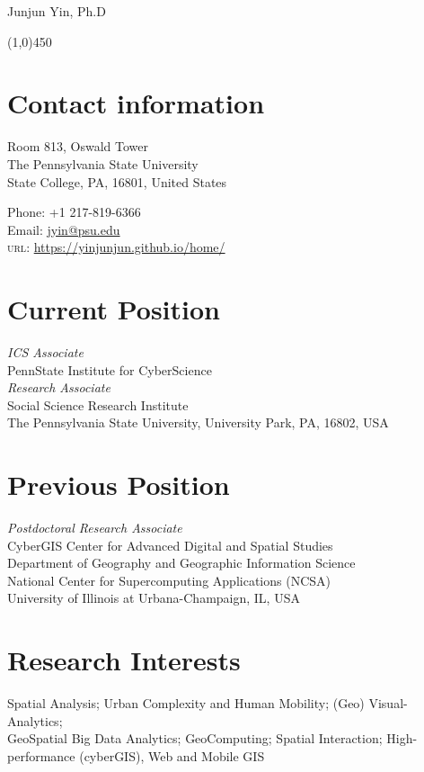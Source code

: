 \documentclass[11pt, a4paper]{article}
\begin{document}
{\LARGE Junjun Yin, Ph.D}
\begin{center}
\line(1,0){450}
\end{center}
\section*{Contact information}

\begin{multicols}{2}
 \begin{flushleft}
Room 813, Oswald Tower\\
The Pennsylvania State University\\
State College, PA, 16801, United States
\end{flushleft}
\columnbreak
\begin{flushright}
Phone: +1 217-819-6366\\[.1cm]
Email: \href{mailto:a.jyin@psu.edu}{jyin@psu.edu}\\[.1cm]
\textsc{url}: \href{https://yinjunjun.github.io/home/}{https://yinjunjun.github.io/home/}
\end{flushright}
\end{multicols}

\section*{Current Position}
\emph{ICS Associate}\\
PennState Institute for CyberScience\\

\emph{Research Associate}\\
Social Science Research Institute\\
The Pennsylvania State University, University Park, PA, 16802, USA

\section*{Previous Position}
\emph{Postdoctoral Research Associate}\\
CyberGIS Center for Advanced Digital and Spatial Studies\\
Department of Geography and Geographic Information Science\\
National Center for Supercomputing Applications (NCSA)\\
University of Illinois at Urbana-Champaign, IL, USA

\section*{Research Interests}
Spatial Analysis; Urban Complexity and Human Mobility; (Geo) Visual-Analytics; \\
GeoSpatial Big Data Analytics; GeoComputing; Spatial Interaction; High-performance (cyberGIS), Web and Mobile GIS
\end{document}
